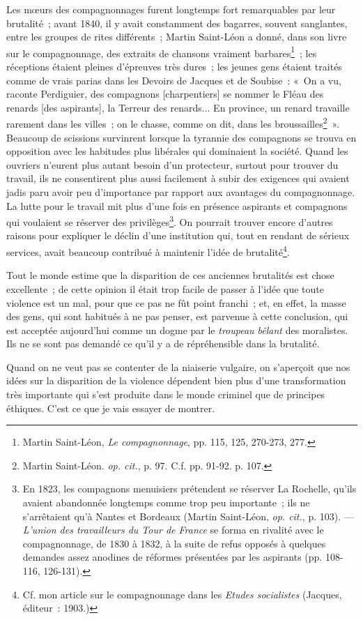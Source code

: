 \documentclass[french,twoside]{book} %
\begin{document}
Les mœurs des compagnonnages furent longtemps fort remarquables par leur brutalité ; avant 1840, il y avait constamment des bagarres, souvent sanglantes, entre les groupes de rites différents ; Martin Saint-Léon a donné, dans son livre sur le compagnonnage, des extraits de chansons vraiment barbares\footnote{ \noindent Martin Saint-Léon, \emph{Le compagnonnage}, pp. 115, 125, 270-273, 277.
 } ; les réceptions étaient pleines d’épreuves très dures ; les jeunes gens étaient traités comme de vrais parias dans les Devoirs de Jacques et de Soubise : « On a vu, raconte Perdiguier, des compagnons [charpentiers] se nommer le Fléau des renards [des aspirants], la Terreur des renards... En province, un renard travaille rarement dans les villes ; on le chasse, comme on dit, dans les broussailles\footnote{ \noindent Martin Saint-Léon. \emph{op. cit.}, p. 97. C.f. pp. 91-92. p. 107.
 } ». Beaucoup de scissions survinrent lorsque la tyrannie des compagnons se trouva en opposition avec les habitudes plus libérales qui dominaient la société. Quand les ouvriers n’eurent plus autant besoin d’un protecteur, surtout pour trouver du travail, ils ne consentirent  plus aussi facilement à subir des exigences qui avaient jadis paru avoir peu d’importance par rapport aux avantages du compagnonnage. La lutte pour le travail mit plus d’une fois en présence aspirants et compagnons qui voulaient se réserver des privilèges\footnote{ \noindent En 1823, les compagnons menuisiers prétendent se réserver La Rochelle, qu’ils avaient abandonnée longtemps comme trop peu importante ; ils ne s’arrêtaient qu’à Nantes et Bordeaux (Martin Saint-Léon, \emph{op. cit.}, p. 103). — \emph{L’union des travailleurs du Tour de France} se forma en rivalité avec le compagnonnage, de 1830 à 1832, à la suite de refus opposés à quelques demandes assez anodines de réformes présentées par les aspirants (pp. 108-116, 126-131).
 }. On pourrait trouver encore d’autres raisons pour expliquer le déclin d’une institution qui, tout en rendant de sérieux services, avait beaucoup contribué à maintenir l’idée de brutalité\footnote{ \noindent Cf. mon article sur le compagnonnage dans les \emph{Etudes socialistes} (Jacques, éditeur : 1903.)
 }.\par
Tout le monde estime que la disparition de ces anciennes brutalités est chose excellente ; de cette opinion il était trop facile de passer à l’idée que toute violence est un mal, pour que ce pas ne fût point franchi ; et, en effet, la masse des gens, qui sont habitués à ne pas penser, est parvenue à cette conclusion, qui est acceptée aujourd’hui comme un dogme par le \emph{troupeau bêlant} des moralistes. Ils ne se sont pas demandé ce qu’il y a de répréhensible dans la brutalité.\par
Quand on ne veut pas se contenter de la niaiserie vulgaire, on s’aperçoit que nos idées sur la disparition de la violence dépendent bien plus d’une transformation très  importante qui s’est produite dans le monde criminel que de principes éthiques. C’est ce que je vais essayer de montrer.\par
\end{document}
